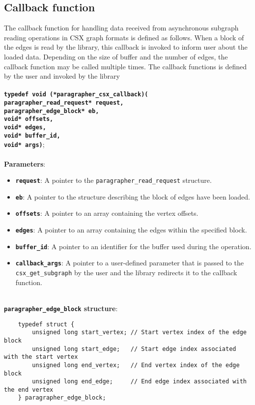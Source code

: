 \documentclass[a4paper]{article}
\begin{document}
\subsection{Callback function}
The callback function for handling data received from asynchronous 
subgraph reading operations in CSX graph formats is defined 
as follows. When a block of the edges is read by the library, this callback is 
invoked to inform user about the loaded data. Depending on the size of buffer
and the number of edges, the callback function may be called multiple times.
The callback functions is defined by the user and invoked by the library
~\\
\\
\textbf{\texttt{typedef void (*paragrapher\_csx\_callback)(
\\{\indent}paragrapher\_read\_request* request, 
\\{\indent}paragrapher\_edge\_block* eb,
\\{\indent}void* offsets, 
\\{\indent}void* edges, 
\\{\indent}void* buffer\_id, 
\\{\indent}void* args)}};
\\
\\
\textbf{Parameters}:
\begin{itemize}
    \setlength{\itemsep}{0pt}
    \setlength{\parskip}{0pt}
    \setlength{\parsep}{0pt}

   \item \textbf{\texttt{request}}: A pointer to the \texttt{paragrapher\_read\_request} structure.
        \item \textbf{\texttt{eb}}: A pointer to the structure describing the block of edges have been loaded.
        \item \textbf{\texttt{offsets}}: A pointer to an array containing the vertex offsets.
        \item \textbf{\texttt{edges}}: A pointer to an array containing the edges within the specified block.
        \item \textbf{\texttt{buffer\_id}}: A pointer to an identifier for the buffer used during the operation.
        \item \textbf{\texttt{callback\_args}}: A pointer to a user-defined parameter that is passed to the \texttt{csx\_get\_subgraph} by the user and the library redirects it to the callback function.
\end{itemize}
~\\
\textbf{\texttt{paragrapher\_edge\_block} structure}:
    \begin{verbatim}
    typedef struct {
        unsigned long start_vertex; // Start vertex index of the edge block
        unsigned long start_edge;   // Start edge index associated with the start vertex
        unsigned long end_vertex;   // End vertex index of the edge block
        unsigned long end_edge;     // End edge index associated with the end vertex
    } paragrapher_edge_block;
    \end{verbatim}
\end{document}

